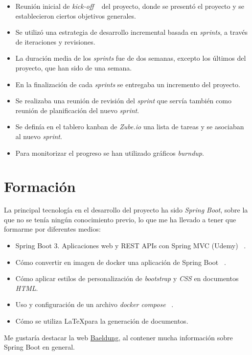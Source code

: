 \begin{itemize}
	\item Reunión inicial de \textit{kick-off} ~\cite{web:kickoff} del proyecto, donde se presentó el proyecto y se establecieron ciertos objetivos generales.
	\item Se utilizó una estrategia de desarrollo incremental basada en \textit{sprints}, a través de iteraciones y revisiones.
	\item La duración media de los \textit{sprints} fue de dos semanas, excepto los últimos del proyecto, que han sido de una semana.
	\item En la finalización de cada \textit{sprints} se entregaba un incremento del proyecto.
	\item Se realizaba una reunión de revisión del \textit{sprint} que servía también como reunión de planificación del nuevo \textit{sprint}.
	\item Se definía en el tablero kanban de \textit{Zube.io} una lista de tareas y se asociaban al nuevo \textit{sprint}.
	\item Para monitorizar el progreso se han utilizado gráficos \textit{burndup}.
\end{itemize}

\section{Formación}

La principal tecnología en el desarrollo del proyecto ha sido \textit{Spring Boot}, sobre la que no se tenía ningún conocimiento previo, lo que me ha llevado a tener que formarme por diferentes medios:

\begin{itemize}
	\item Spring Boot 3. Aplicaciones web y REST APIs con Spring MVC (Udemy) ~\cite{udemy:eliseo}.
	\item Cómo convertir en imagen de docker una aplicación de Spring Boot ~\cite{doc:springbootdocker}.
	\item Cómo aplicar estilos de personalización de \textit{bootstrap} y \textit{CSS} en documentos \textit{HTML}.
	\item Uso y configuración de un archivo \textit{docker compose} ~\cite{web:dockercompose}.
	\item Cómo se utiliza \LaTeX para la generación de documentos.
\end{itemize}

Me gustaría destacar la web \href{https://www.baeldung.com/spring-boot}{Baeldung}, al contener mucha información sobre Spring Boot en general.

